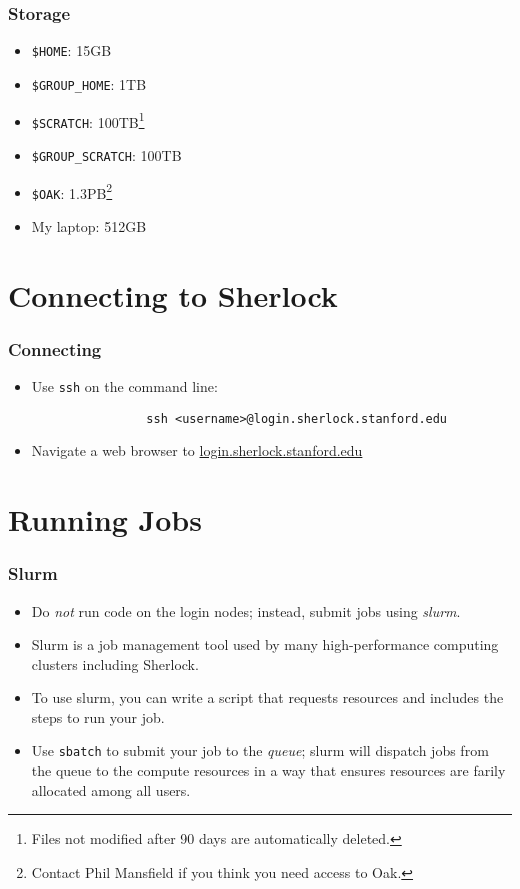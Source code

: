 \documentclass[aspectratio=169]{beamer}
\begin{document}
\begin{frame}
	\frametitle{Storage}
	\begin{itemize}
		\item \texttt{\$HOME}: 15GB
		\item \texttt{\$GROUP\_HOME}: 1TB
		\item \texttt{\$SCRATCH}: 100TB\footnote{Files not modified after 90 days are automatically deleted.}
		\item \texttt{\$GROUP\_SCRATCH}: 100TB\footnotemark[\value{footnote}]
		\item \texttt{\$OAK}: 1.3PB\footnote{Contact Phil Mansfield if you think you need access to Oak.}
		\item My laptop: 512GB
	\end{itemize}
\end{frame}


\section{Connecting to Sherlock}

\frame{\sectionpage}

\begin{frame}[fragile]
	\frametitle{Connecting}
	\begin{itemize}
		\item Use \texttt{ssh} on the command line:
			\begin{verbatim}
				ssh <username>@login.sherlock.stanford.edu
			\end{verbatim}
		\item Navigate a web browser to \url{login.sherlock.stanford.edu}
	\end{itemize}
\end{frame}


\section{Running Jobs}

\frame{\sectionpage}

\begin{frame}
	\frametitle{Slurm}
	\begin{itemize}
		\item Do \emph{not} run code on the login nodes; instead, submit jobs using \emph{slurm}.
		\item Slurm is a job management tool used by many high-performance computing clusters including Sherlock.
		\item To use slurm, you can write a script that requests resources and includes the steps to run your job.
		\item Use \texttt{sbatch} to submit your job to the \emph{queue}; slurm will dispatch jobs from the queue to the compute resources in a way that ensures resources are farily allocated among all users.
	\end{itemize}
\end{frame}
\end{document}
